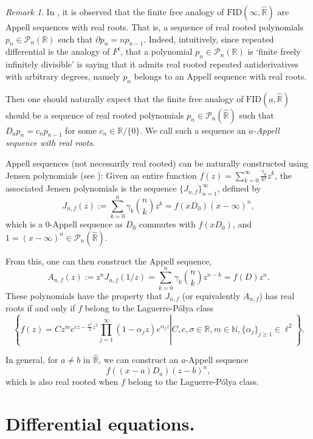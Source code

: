 \documentclass[reqno,11pt]{amsart}
\theoremstyle{remark}
\newtheorem{remark}[theorem]{Remark}
\newcommand{\rr}{\mathbb{R}}
\newcommand{\polar}[1]{D_{#1}}
\newcommand{\freepower}[1]{F^{#1}}
\newcommand{\pol}{\mathcal{P}}
\begin{document}
\begin{remark}
    In \cite{campbell2024free}, it is observed that the finite free analogy of $\text{FID}(\infty,\hat{\rr})$ are Appell sequences with real roots. That is, a sequence of real rooted polynomials $ p_{n}\in \pol_{n}(\rr) $ such that $ \partial p_n = np_{n-1} $. Indeed, intuitively, since repeated differential is the analogy of $\freepower{t}$, that a polynomial $p_n\in \pol_n(\rr)$ is ‘finite freely infinitely divisible' is saying that it admits real rooted repeated antiderivatives with arbitrary degrees, namely $p_n$ belongs to an Appell sequence with real roots.

    Then one should naturally expect that the finite free analogy of $\text{FID}(a,\hat{\rr})  $ should be a sequence of real rooted polynomials $p_n\in \pol_n(\hat{\rr})$ such that $ \polar{a}p_{n} = c_np_{n-1} $ for some $ c_n\in \rr/\{0\} $. We call such a sequence an \emph{$a$-Appell sequence with real roots}.

    Appell sequences (not necessarily real rooted) can be naturally constructed using Jensen polynomials (see \cite{campbell2024universality}\cite{campbell2024free}): Given an entire function $f(z)= \sum_{k=0}^\infty 
    \frac{\gamma_k}{k!}z^k$, the associated Jensen polynomials is the sequence $ \{J_{n,f}\}_{n=1}^\infty $, defined by
    $$ J_{n,f}(z):= \sum_{k=0}^n \gamma_k \binom{n}{k}z^k = f(x\polar{0})(x-\infty)^n, $$
    which is a $0$-Appell sequence as $ \polar{0} $ commutes with $ f(x\polar{0}) $, and $ 1=(x-\infty)^n \in \pol_n(\hat{\rr})$.
    
    From this, one can then construct the Appell sequence,
    $$ A_{n,f}(z):= z^nJ_{n,f}(1/z) = \sum_{k=0}^n \gamma_k \binom{n}{k}z^{n-k}= f(D)z^n. $$
    These polynomials have the property that $ J_{n,f} $ (or equivalently $A_{n,f}$) has real roots if and only if $f$ belong to the Laguerre-P{\'o}lya class 
    $$ \left\{\left. f(z)= Cz^m e^{cz- \frac{\sigma^2}{2}z^2}\prod_{j=1}^\infty( 1-\alpha_jz )e^{ \alpha_j z }\right|  C,c,\sigma\in \rr,m\in \mathbb{N},\{\alpha_j\}_{j\geq 1}\in \ell^2 \right\}. $$

    In general, for $a\neq b $ in $\hat{\rr}$, we can construct an $a$-Appell sequence
    $$ f((x-a)\polar{a})(z-b)^n, $$
    which is also real rooted when $f$ belong to the Laguerre-P{\'o}lya class.
\end{remark}




\section{Differential equations.}
\label{sec:analytical}
\end{document}
